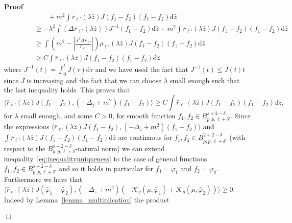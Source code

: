 \documentclass[a4paper,10pt]{article}
\newcommand{\mathd}{\mathrm{d}}
\newenvironment{proof}{\noindent\textbf{Proof\ }}{\hspace*{\fill}$\Box$\medskip}
\begin{document}
\begin{proof}
\[\begin{array}{l}
       \qquad \hspace{4em} + m^2 \int \bar{r}_{\ell'} (\lambda \hat{z}) J (f_1
       - f_2) (f_1 - f_2) \mathd \hat{z}\\
       \qquad \qquad \geqslant - \lambda^2 \int (\Delta \bar{r}_{\ell'}
       (\lambda \hat{z})) J^{- 1} (f_1 - f_2) \mathd \hat{z} + m^2 \int
       \bar{r}_{\ell'} (\lambda \hat{z}) J (f_1 - f_2) (f_1 - f_2) \mathd
       \hat{z}\\
       \qquad \qquad \geqslant \int \left( m^2 - \left| \frac{\lambda^2 \Delta
       \bar{r}_{\ell'}}{\bar{r}_{\ell'}} \right| \right) \rho_{\ell'} (\lambda
       \hat{z}) J (f_1 - f_2) (f_1 - f_2) \mathd \hat{z}\\
       \hspace{4em} \geqslant C \int \bar{r}_{\ell'} (\lambda \hat{z}) J (f_1
       - f_2) (f_1 - f_2) \mathd \hat{z}
     \end{array} \]
  where $J^{- 1} (t) = \int_0^t J (\tau) \mathd \tau$ and we have used the
  fact that $J^{- 1} (t) \leqslant J (t) t$ since $J$ is increasing and the
  fact that we can choose $\lambda$ small enough such that the last inequality
  holds. This proves that
  \begin{equation}
    \langle \bar{r}_{\ell'} (\lambda \hat{z}) J (f_1 - f_2), (-
    \Delta_{\hat{z}} + m^2) (f_1 - f_2) \rangle \geqslant C \int
    \bar{r}_{\ell'} (\lambda \hat{z}) J (f_1 - f_2) (f_1 - f_2) \mathd \hat{z}
    \label{eq:inequalityuniqueness},
  \end{equation}
  for $\lambda$ small enough, and some $C > 0$, for smooth function $f_1, f_2
  \in B^{s + 2 - \delta}_{p, p, \ell + \delta'}$. Since the expressions
  $\langle \bar{r}_{\ell'} (\lambda \hat{z}) J (f_1 - f_2), (-
  \Delta_{\hat{z}} + m^2) (f_1 - f_2) \rangle$ and $\int \bar{r}_{\ell'}
  (\lambda \hat{z}) J (f_1 - f_2) (f_1 - f_2) \mathd \hat{z}$ are continuous
  for $f_1, f_2 \in B^{2 + 2 - \delta}_{p, p, \ell + \delta'}$ (with respect
  to the $B^{s + 2 - \delta}_{p, p, \ell + \delta}$-natural norm) we can
  extend inequality~{\eqref{eq:inequalityuniqueness}} to the case of general
  functions $f_1, f_2 \in B^{s + 2 - \delta}_{p, p, \ell + \delta'}$ and so it
  holds in particular for $f_1 = \bar{\varphi}_1$ and $f_2 = \bar{\varphi}_2$.
  Furthermore we have that $\langle \bar{r}_{\ell'} (\lambda \hat{z}) J
  (\bar{\varphi}_1 - \bar{\varphi}_2), (- \Delta_{\hat{z}} + m^2) (-
  \mathcal{K}_g (\mu, \bar{\varphi}_1) + \mathcal{K}_g (\mu, \bar{\varphi}_2))
  \rangle \geqslant 0$. Indeed by Lemma~\ref{lemma_multiplication} the product

\end{proof}
\end{document}
